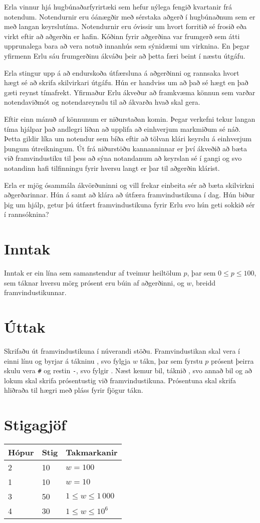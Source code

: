 
Erla vinnur hjá hugbúnaðarfyrirtæki sem hefur nýlega fengið kvartanir frá notendum.
Notendurnir eru óánægðir með sérstaka aðgerð í hugbúnaðnum sem er með langan keyrslutíma.
Notendurnir eru óvissir um hvort forritið sé frosið eða virkt eftir að aðgerðin er hafin.
Kóðinn fyrir aðgerðina var frumgerð sem átti upprunalega bara að vera notuð innanhús sem sýnidæmi um virknina.
En þegar yfirmenn Erlu sáu frumgerðinu ákváðu þeir að þetta færi beint í næstu útgáfu.

Erla stingur upp á að endurskoða útfærsluna á aðgerðinni og rannsaka hvort hægt sé að skrifa skilvirkari útgáfu.
Hún er handviss um að það sé hægt en það gæti reynst tímafrekt.
Yfirmaður Erlu ákveður að framkvæma könnun sem varðar notendaviðmót og notendareynslu til að ákvarða hvað skal gera.

Eftir einn mánuð af könnunum er niðurstaðan komin.
Þegar verkefni tekur langan tíma hjálpar það andlegri líðan að upplifa að einhverjum markmiðum sé náð.
Þetta gildir líka um notendur sem bíða eftir að tölvan klári keyrslu á einhverjum þungum útreikningum.
Út frá niðurstöðu kannanninnar er því ákveðið að bæta við framvindustiku til þess að sýna notandanum að keyrslan sé í gangi og svo notandinn hafi tilfinningu fyrir hversu langt er þar til aðgerðin klárist.

Erla er mjög ósammála ákvörðuninni og vill frekar einbeita sér að bæta skilvirkni aðgerðarinnar.
Hún á samt að klára að útfæra framvindustikuna í dag.
Hún biður þig um hjálp, getur þú útfært framvindustikuna fyrir Erlu svo hún geti sokkið sér í rannsóknina?

\section*{Inntak}
Inntak er ein lína sem samanstendur af tveimur heiltölum $p$, þar sem $0 \leq p \leq 100$, sem táknar hversu mörg prósent eru búin af aðgerðinni, og $w$, breidd framvindustikunnar.

\section*{Úttak}
Skrifaðu út framvindustikuna í núverandi stöðu.
Framvindustikan skal vera í einni línu og byrjar á tákninu \texttt{\lbrack}, svo fylgja $w$ tákn, þar sem fyrstu $p$ prósent þeirra skulu vera \texttt{\#} og restin \texttt{-}, svo fylgir \texttt{\rbrack}.
Næst kemur bil, táknið \texttt{\textbar}, svo annað bil og að lokum skal skrifa prósentustig við framvindustikuna.
Prósentuna skal skrifa hliðraða til hægri með pláss fyrir fjögur tákn.

\section*{Stigagjöf}
\begin{tabular}{|l|l|l|}
\hline
Hópur & Stig & Takmarkanir \\ \hline
2     & 10   & $w = 100$ \\ \hline
1     & 10   & $w = 10$ \\ \hline
3     & 50   & $1 \leq w \leq 1\,000$ \\ \hline
4     & 30   & $1 \leq w \leq 10^6$ \\ \hline
\end{tabular}

